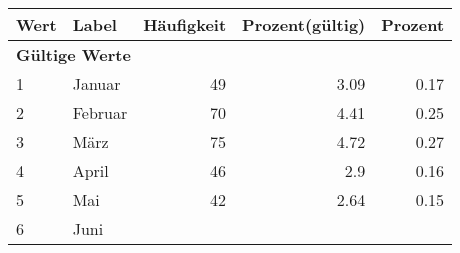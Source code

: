      \begin{longtable}{lXrrr}
     \toprule
     \textbf{Wert} & \textbf{Label} & \textbf{Häufigkeit} & \textbf{Prozent(gültig)} & \textbf{Prozent} \\
     \endhead
     \midrule
     \multicolumn{5}{l}{\textbf{Gültige Werte}}\\

     1 &
     \multicolumn{1}{X}{ Januar   } &


       \num{49} &
       \num[round-mode=places,round-precision=2]{3,09} &
         \num[round-mode=places,round-precision=2]{0,17} \\

     2 &
     \multicolumn{1}{X}{ Februar   } &


       \num{70} &
       \num[round-mode=places,round-precision=2]{4,41} &
         \num[round-mode=places,round-precision=2]{0,25} \\

     3 &
     \multicolumn{1}{X}{ März   } &


       \num{75} &
       \num[round-mode=places,round-precision=2]{4,72} &
         \num[round-mode=places,round-precision=2]{0,27} \\

     4 &
     \multicolumn{1}{X}{ April   } &


       \num{46} &
       \num[round-mode=places,round-precision=2]{2,9} &
         \num[round-mode=places,round-precision=2]{0,16} \\

     5 &
     \multicolumn{1}{X}{ Mai   } &


       \num{42} &
       \num[round-mode=places,round-precision=2]{2,64} &
         \num[round-mode=places,round-precision=2]{0,15} \\

     6 &
     \multicolumn{1}{X}{ Juni   } &



\end{longtable}
